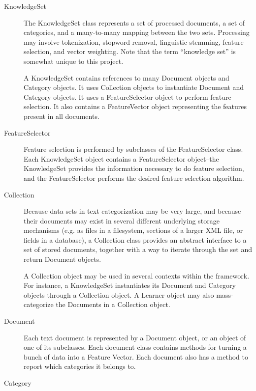 \documentclass[a4paper]{report}
\begin{document}
\begin{description}

\item[KnowledgeSet]

The KnowledgeSet class represents a set of processed documents, a set
of categories, and a many-to-many mapping between the two sets.
Processing may involve tokenization, stopword removal, linguistic
stemming, feature selection, and vector weighting.  Note that the term
``knowledge set'' is somewhat unique to this project.

A KnowledgeSet contains references to many Document objects and
Category objects.  It uses Collection objects to instantiate Document
and Category objects.  It uses a FeatureSelector object to perform
feature selection.  It also contains a FeatureVector object
representing the features present in all documents.

\item[FeatureSelector]

Feature selection is performed by subclasses of the FeatureSelector
class.  Each KnowledgeSet object contains a FeatureSelector
object--the KnowledgeSet provides the information necessary to do
feature selection, and the FeatureSelector performs the desired
feature selection algorithm.

\item[Collection]

Because data sets in text categorization may be very large, and
because their documents may exist in several different underlying
storage mechanisms (e.g. as files in a filesystem, sections of a
larger XML file, or fields in a database), a Collection class provides
an abstract interface to a set of stored documents, together with a
way to iterate through the set and return Document objects.

A Collection object may be used in several contexts within the
framework.  For instance, a KnowledgeSet instantiates its Document and
Category objects through a Collection object.  A Learner object may
also mass-categorize the Documents in a Collection object.

\item[Document]

Each text document is represented by a Document object, or an object
of one of its subclasses.  Each document class contains methods for
turning a bunch of data into a Feature Vector.  Each document also has
a method to report which categories it belongs to.

\item[Category]


\end{description}
\end{document}
